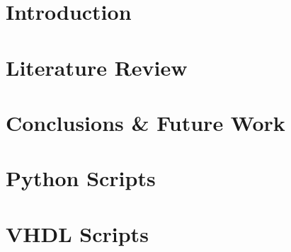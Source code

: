 \documentclass[11pt]{report}
\begin{document}

\tableofcontents
\listoffigures
\listoftables
\newpage


\chapter{Introduction}
\label{chpIntro}
	
	
	

%
%

\FloatBarrier
\chapter{Literature Review}
\label{chpLitReview}
	
	
	

%
%

\FloatBarrier
\chapter{Conclusions \& Future Work}
\label{chpConclusions}
	
	




\appendix

\FloatBarrier
\chapter{Python Scripts}
\label{appPythonScripts}

\FloatBarrier
\chapter{VHDL Scripts}
\label{appVHDLScripts}

\clearpage
{}
\printindex
\end{document}
